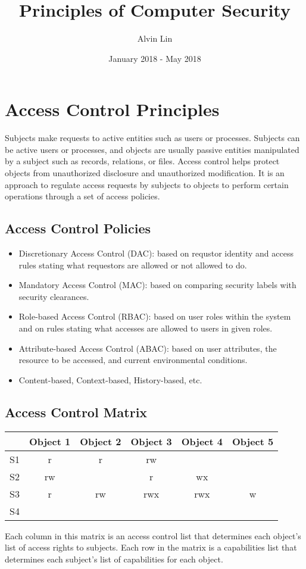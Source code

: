 \documentclass{math}
\title{Principles of Computer Security}
\author{Alvin Lin}
\date{January 2018 - May 2018}
\begin{document}
\maketitle

\section*{Access Control Principles}
Subjects make requests to active entities such as users or processes. Subjects
can be active users or processes, and objects are usually passive entities
manipulated by a subject such as records, relations, or files. Access control
helps protect objects from unauthorized disclosure and unauthorized
modification. It is an approach to regulate access requests by subjects to
objects to perform certain operations through a set of access policies.

\subsection*{Access Control Policies}
\begin{itemize}
  \item Discretionary Access Control (DAC): based on requstor identity and
  access rules stating what requestors are allowed or not allowed to do.
  \item Mandatory Access Control (MAC): based on comparing security labels
  with security clearances.
  \item Role-based Access Control (RBAC): based on user roles within the system
  and on rules stating what accesses are allowed to users in given roles.
  \item Attribute-based Access Control (ABAC): based on user attributes, the
  resource to be accessed, and current environmental conditions.
  \item Content-based, Context-based, History-based, etc.
\end{itemize}

\subsection*{Access Control Matrix}
\begin{center}
  \begin{tabular}{|c|c|c|c|c|c|}
    \hline
    & Object 1 & Object 2 & Object 3 & Object 4 & Object 5 \\
    \hline
    S1 & r & r & rw & & \\
    \hline
    S2 & rw & & r & wx & \\
    \hline
    S3 & r & rw & rwx & rwx & w \\
    \hline
    S4 & & & & & \\
    \hline
  \end{tabular}
\end{center}
Each column in this matrix is an access control list that determines each
object's list of access rights to subjects. Each row in the matrix is a
capabilities list that determines each subject's list of capabilities for each
object.
\end{document}
